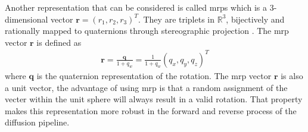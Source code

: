 \documentclass[12pt,DIV14,BCOR12mm,a4paper,footinclude=false,headinclude,parskip=half-,twoside,openright,cleardoublepage=empty,toc=index,bibliography=totoc,listof=totoc]{scrreprt}
\numberwithin{equation}{chapter}
\begin{document}
Another representation that can be considered is called \glspl{mrp} which is a 3-dimensional vector $\mathbf{r} = (r_{1}, r_{2}, r_{3})^{T}$. They are triplets in $\mathbb{R}^{3} $, bijectively and rationally mapped to quaternions through stereographic projection \cite{rodrigues}. The \gls{mrp} vector $\mathbf{r}$ is defined as
\begin{align}
  \mathbf{r} = \frac{\mathbf{q}}{1+q_{w}} = \frac{1}{1+q_{w}}(q_{x}, q_{y}, q_{z})^{T}
\end{align}
where $\mathbf{q}$ is the quaternion representation of the rotation. The \gls{mrp} vector $\mathbf{r}$ is also a unit vector, the advantage of using \gls{mrp} is that a random assignment of the vecter within the unit sphere will always result in a valid rotation. That property makes this representation more robust in the forward and reverse process of the diffusion pipeline.
\end{document}
